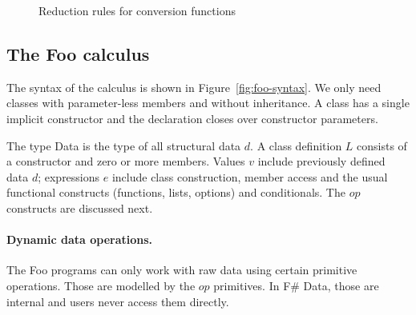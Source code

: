 \documentclass[10pt,preprint,blind,clearpagebib]{sigplanconf}
\newcommand{\ident}[1]{\textnormal{\sffamily #1}}
\begin{document}
\begin{figure}
\caption{Reduction rules for conversion functions}
\label{fig:op-conversions}
\vspace{-0.5em}
\end{figure}


\subsection{The Foo calculus}
\label{sec:formal-ff}

The syntax of the calculus is shown in Figure~\ref{fig:foo-syntax}. We only need classes with 
parameter-less members and without inheritance. A class has a single implicit constructor and the 
declaration closes over constructor parameters. 

The type \ident{Data} is the type of all structural data $d$. A class definition $L$ consists of 
a constructor and zero or more members. Values $v$ include previously defined data $d$; expressions
$e$ include class construction, member access and the usual functional constructs (functions,
lists, options) and conditionals. The $op$ constructs are discussed next.


\paragraph{Dynamic data operations.}

The Foo programs can only work with raw data using certain primitive operations. Those are modelled
by the $op$ primitives. In F\# Data, those are internal and users never access them directly.

\end{document}
